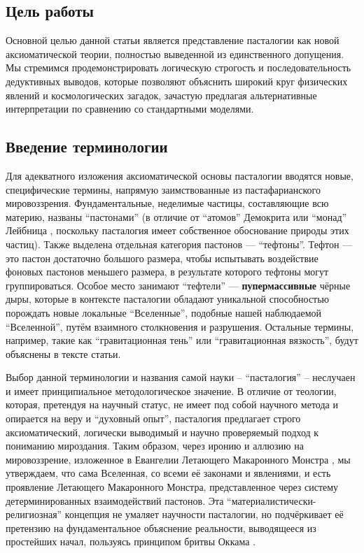\documentclass[pdflatex,sn-mathphys-num]{sn-jnl}
\begin{document}
\subsection{Цель работы}\label{subsec:purpose}

Основной целью данной статьи является представление пасталогии как новой аксиоматической теории, полностью выведенной из единственного допущения. Мы стремимся продемонстрировать логическую строгость и последовательность дедуктивных выводов, которые позволяют объяснить широкий круг физических явлений и космологических загадок, зачастую предлагая альтернативные интерпретации по сравнению со стандартными моделями.

\subsection{Введение терминологии}\label{subsec:terminology}

Для адекватного изложения аксиоматической основы пасталогии вводятся новые, специфические термины, напрямую заимствованные из пастафарианского мировоззрения. Фундаментальные, неделимые частицы, составляющие всю материю, названы ``пастонами'' (в отличие от ``атомов'' Демокрита \cite{kirk1983-democritus} или ``монад'' Лейбница \cite{leibniz1989-monadology}, поскольку пасталогия имеет собственное обоснование природы этих частиц). Также выделена отдельная категория пастонов --- ``тефтоны''. Тефтон --- это пастон достаточно большого размера, чтобы испытывать воздействие фоновых пастонов меньшего размера, в результате которого тефтоны могут группироваться. Особое место занимают ``тефтели'' --- \textbf{пупермассивные} чёрные дыры, которые в контексте пасталогии обладают уникальной способностью порождать новые локальные ``Вселенные'', подобные нашей наблюдаемой ``Вселенной'', путём взаимного столкновения и разрушения. Остальные термины, например, такие как ``гравитационная тень'' или ``гравитационная вязкость'', будут объяснены в тексте статьи.

Выбор данной терминологии и названия самой науки -- ``пасталогия'' -- неслучаен и имеет принципиальное методологическое значение. В отличие от теологии, которая, претендуя на научный статус, не имеет под собой научного метода и опирается на веру и ``духовный опыт'', пасталогия предлагает строго аксиоматический, логически выводимый и научно проверяемый подход к пониманию мироздания. Таким образом, через иронию и аллюзию на мировоззрение, изложенное в Евангелии Летающего Макаронного Монстра \cite{henderson2006}, мы утверждаем, что сама Вселенная, со всеми её законами и явлениями, и есть проявление Летающего Макаронного Монстра, представленное через систему детерминированных взаимодействий пастонов. Эта ``материалистически-религиозная'' концепция не умаляет научности пасталогии, но подчёркивает её претензию на фундаментальное объяснение реальности, выводящееся из простейших начал, пользуясь принципом бритвы Оккама \cite{ockham-razor-sep}.
\end{document}
